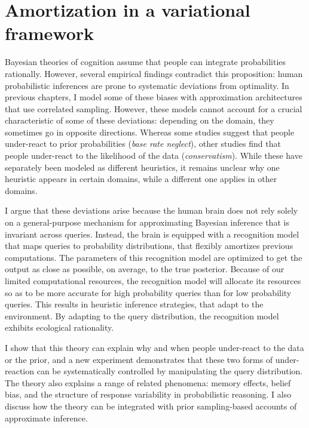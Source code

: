 
\chapter{Amortization in a variational framework}
\label{chap:LTI}

Bayesian theories of cognition assume that people can integrate probabilities rationally. However, several empirical findings contradict this proposition: human probabilistic inferences are prone to systematic deviations from optimality. In previous chapters, I model some of these biases with approximation architectures that use correlated sampling. However, these models cannot account for a crucial characteristic of some of these deviations: depending on the domain, they sometimes go in opposite directions. Whereas some studies suggest that people under-react to prior probabilities (\emph{base rate neglect}), other studies find that people under-react to the likelihood of the data (\emph{conservatism}). While these have separately been modeled as different heuristics, it remains unclear why one heuristic appears in certain domains, while a different one applies in other domains.

I argue that these deviations arise because the human brain does not rely solely on a general-purpose mechanism for approximating Bayesian inference that is invariant across queries. Instead, the brain is equipped with a recognition model that maps queries to probability distributions, that flexibly amortizes previous computations. The parameters of this recognition model are optimized to get the output as close as possible, on average, to the true posterior. Because of our limited computational resources, the recognition model will allocate its resources so as to be more accurate for high probability queries than for low probability queries. This results in heuristic inference strategies, that adapt to the environment. By adapting to the query distribution, the recognition model exhibits ecological rationality.


I show that this theory can explain why and when people under-react to the data or the prior, and a new experiment demonstrates that these two forms of under-reaction can be systematically controlled by manipulating the query distribution. The theory also explains a range of related phenomena: memory effects, belief bias, and the structure of response variability in probabilistic reasoning. I also discuss how the theory can be integrated with prior sampling-based accounts of approximate inference.

